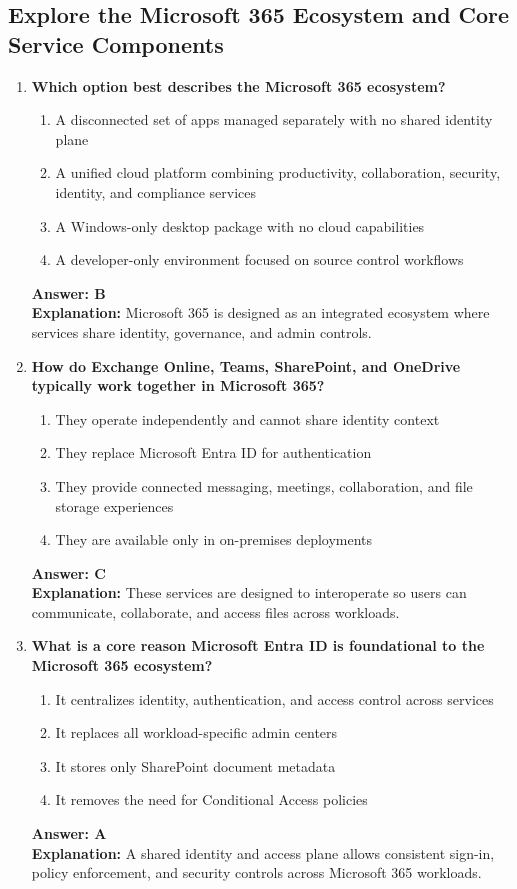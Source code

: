 \documentclass[10pt]{article}
\begin{document}
\subsection{Explore the Microsoft 365 Ecosystem and Core Service Components}
\begin{enumerate}[leftmargin=*]

\item \textbf{Which option best describes the Microsoft 365 ecosystem?}
\begin{enumerate}[label=\Alph*.]
  \item A disconnected set of apps managed separately with no shared identity plane
  \item A unified cloud platform combining productivity, collaboration, security, identity, and compliance services
  \item A Windows-only desktop package with no cloud capabilities
  \item A developer-only environment focused on source control workflows
\end{enumerate}
\textbf{Answer: B}\\
\textbf{Explanation:} Microsoft 365 is designed as an integrated ecosystem where services share identity, governance, and admin controls.

\item \textbf{How do Exchange Online, Teams, SharePoint, and OneDrive typically work together in Microsoft 365?}
\begin{enumerate}[label=\Alph*.]
  \item They operate independently and cannot share identity context
  \item They replace Microsoft Entra ID for authentication
  \item They provide connected messaging, meetings, collaboration, and file storage experiences
  \item They are available only in on-premises deployments
\end{enumerate}
\textbf{Answer: C}\\
\textbf{Explanation:} These services are designed to interoperate so users can communicate, collaborate, and access files across workloads.

\item \textbf{What is a core reason Microsoft Entra ID is foundational to the Microsoft 365 ecosystem?}
\begin{enumerate}[label=\Alph*.]
  \item It centralizes identity, authentication, and access control across services
  \item It replaces all workload-specific admin centers
  \item It stores only SharePoint document metadata
  \item It removes the need for Conditional Access policies
\end{enumerate}
\textbf{Answer: A}\\
\textbf{Explanation:} A shared identity and access plane allows consistent sign-in, policy enforcement, and security controls across Microsoft 365 workloads.


\end{enumerate}
\end{document}
